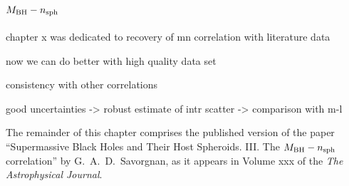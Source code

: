 \chapter{$M_{\rm BH} - n_{\rm sph}$}
\label{ch:mn}

chapter x was dedicated to recovery of mn correlation with literature data

now we can do better with high quality data set

consistency with other correlations

good uncertainties -> robust estimate of intr scatter -> comparison with m-l



The remainder of this chapter comprises the published version of the paper 
``Supermassive Black Holes and Their Host Spheroids. 
III. The $M_{\rm BH} - n_{\rm sph}$ correlation'' 
by G.~A.~D.~Savorgnan,  
as it appears in Volume xxx of the \emph{The Astrophysical Journal}. 




